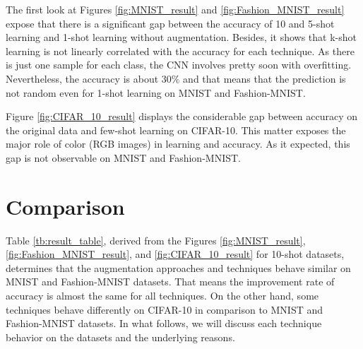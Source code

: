 The first look at Figures \ref{fig:MNIST_result} and \ref{fig:Fashion_MNIST_result} expose that there is
a significant gap between the accuracy of 10 and 5-shot learning and 1-shot learning without augmentation. Besides,
it shows that k-shot learning is not linearly correlated with the accuracy for each technique. As there is
just one sample for each class, the CNN involves pretty soon with overfitting. Nevertheless, the
accuracy is about $30\%$ and that means that the prediction is not random even for 1-shot
learning on MNIST and Fashion-MNIST.

Figure \ref{fig:CIFAR_10_result} displays the considerable gap
between accuracy on the original data and few-shot learning on CIFAR-10. This matter exposes the major
role of color (RGB images) in learning and accuracy. As it expected, this gap is not observable on MNIST
and Fashion-MNIST.

\section{Comparison}

Table \ref{tb:result_table}, derived from the Figures \ref{fig:MNIST_result}, \ref{fig:Fashion_MNIST_result}, and
\ref{fig:CIFAR_10_result} for 10-shot datasets, determines that the augmentation approaches and
techniques behave similar on MNIST and Fashion-MNIST datasets. That means the improvement rate of
accuracy is almost the same for all techniques. On the other hand, some techniques behave
differently on CIFAR-10 in comparison to MNIST and Fashion-MNIST datasets. In what follows, we will
discuss each technique behavior on the datasets and the underlying reasons.

